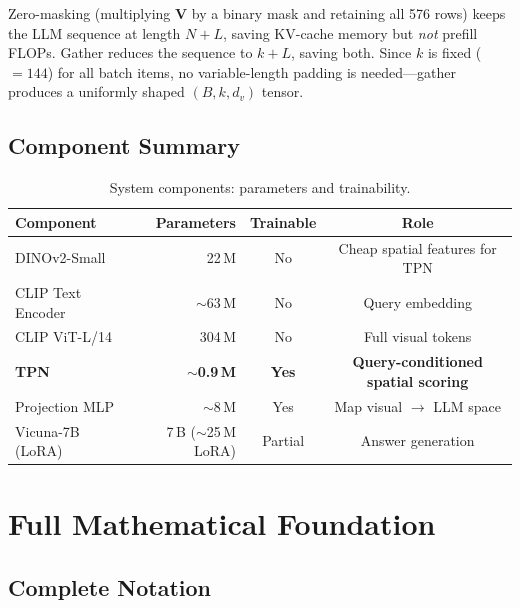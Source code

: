 \documentclass[11pt,a4paper]{article}
\newcommand{\mV}{\mathbf{V}}
\begin{document}
\begin{notebox}[title={Why gather, not zero-masking}]
Zero-masking (multiplying $\mV$ by a binary mask and retaining all 576 rows)
keeps the LLM sequence at length $N{+}L$, saving KV-cache memory but
\emph{not} prefill FLOPs. Gather reduces the sequence to $k{+}L$, saving
both. Since $k$ is fixed ($=144$) for all batch items, no variable-length
padding is needed---gather produces a uniformly shaped $(B, k, d_v)$ tensor.
\end{notebox}

\subsection{Component Summary}

\begin{table}[h]
\centering
\caption{System components: parameters and trainability.}
\label{tab:components}
\renewcommand{\arraystretch}{1.15}
\small
\begin{tabular}{@{}lrcc@{}}
  \toprule
  Component & Parameters & Trainable & Role \\
  \midrule
  DINOv2-Small      & 22\,M        & No      & Cheap spatial features for TPN \\
  CLIP Text Encoder & $\sim$63\,M  & No      & Query embedding \\
  CLIP ViT-L/14     & 304\,M       & No      & Full visual tokens \\
  \textbf{TPN}      & \textbf{$\sim$0.9\,M} & \textbf{Yes} & \textbf{Query-conditioned spatial scoring} \\
  Projection MLP    & $\sim$8\,M   & Yes     & Map visual $\to$ LLM space \\
  Vicuna-7B (LoRA)  & 7\,B ($\sim$25\,M LoRA) & Partial & Answer generation \\
  \bottomrule
\end{tabular}
\end{table}

\section{Full Mathematical Foundation}
\label{sec:math}

\subsection{Complete Notation}
\end{document}
